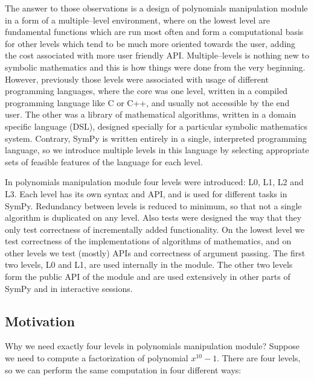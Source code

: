 The answer to those observations is a design of polynomials manipulation module in a form of a
multiple--level environment, where on the lowest level are fundamental functions which are run
most often and form a computational basis for other levels which tend to be much more oriented
towards the user, adding the cost associated with more user friendly API. Multiple--levels is
nothing new to symbolic mathematics and this is how things were done from the very beginning.
However, previously those levels were associated with usage of different programming languages,
where the core was one level, written in a compiled programming language like C or C++, and
usually not accessible by the end user. The other was a library of mathematical algorithms,
written in a domain specific language (DSL), designed specially for a particular symbolic
mathematics system. Contrary, SymPy is written entirely in a single, interpreted programming
language, so we introduce multiple levels in this language by selecting appropriate sets of
feasible features of the language for each level.

In polynomials manipulation module four levels were introduced: L0, L1, L2 and L3. Each level
has its own syntax and API, and is used for different tasks in SymPy. Redundancy between
levels is reduced to minimum, so that not a single algorithm is duplicated on any level. Also
tests were designed the way that they only test correctness of incrementally added functionality.
On the lowest level we test correctness of the implementations of algorithms of mathematics, and
on other levels we test (mostly) APIs and correctness of argument passing. The first two levels,
L0 and L1, are used internally in the module. The other two levels form the public API of the
module and are used extensively in other parts of SymPy and in interactive sessions.


\subsection{Motivation}\label{thesis-struct-motivation}

Why we need exactly four levels in polynomials manipulation module? Suppose we need to compute
a factorization of polynomial $x^{10} - 1$. There are four levels, so we can perform the same
computation in four different ways:

